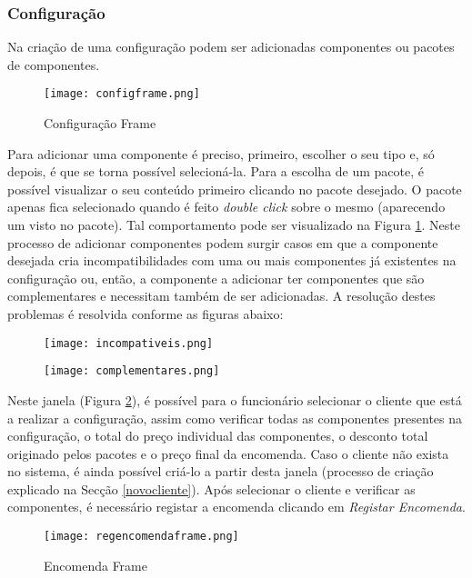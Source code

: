 \subsubsection{Configuração}
Na criação de uma configuração podem ser adicionadas componentes ou pacotes de componentes.

\begin{figure}[H]
	\centering
	\texttt{[image: configframe.png]}
	\caption{Configuração Frame}
	\label{configframe}
\end{figure}

Para adicionar uma componente é preciso, primeiro, escolher o seu tipo e, só depois, é que se torna possível selecioná-la. Para a escolha de um pacote, é possível visualizar o seu conteúdo primeiro clicando no pacote desejado. O pacote apenas fica selecionado quando é feito \textit{double click} sobre o mesmo (aparecendo um visto no pacote). Tal comportamento pode ser visualizado na Figura \ref{configframe}.
Neste processo de adicionar componentes podem surgir casos em que a componente desejada cria incompatibilidades com uma ou mais componentes já existentes na configuração ou, então, a componente a adicionar ter componentes que são complementares e necessitam também de ser adicionadas. A resolução destes problemas é resolvida conforme as figuras abaixo:

\begin{figure}[H]
	\centering
	\texttt{[image: incompativeis.png]}
\end{figure}

\begin{figure}[H]
	\centering
	\texttt{[image: complementares.png]}
\end{figure}





Neste janela (Figura \ref{regencomendaframe}), é possível para o funcionário selecionar o cliente que está a realizar a configuração, assim como verificar todas as componentes presentes na configuração, o total do preço individual das componentes, o desconto total originado pelos pacotes e o preço final da encomenda. Caso o cliente não exista no sistema, é ainda possível criá-lo a partir desta janela (processo de criação explicado na Secção \ref{novocliente}). Após selecionar o cliente e verificar as componentes, é necessário registar a encomenda clicando em \textit{Registar Encomenda}.

\begin{figure}[H]
	\centering
	\texttt{[image: regencomendaframe.png]}
	\caption{Encomenda Frame}
	\label{regencomendaframe}
\end{figure}

